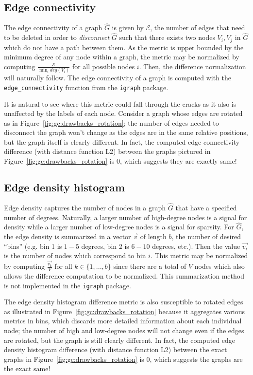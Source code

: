 \subsection{Edge connectivity}

The edge connectivity of a graph $\hat{G}$ is given by $\mathcal{E}$, the 
number of edges that need to be deleted in order to \textit{disconnect} 
$\hat{G}$ such that there exists two nodes $V_i,V_j$ in $\hat{G}$ which do not 
have a path between them.
As the metric is upper bounded by the minimum 
degree of any node within a graph, the metric may be normalized by computing 
$\frac{\mathcal{E}}{\min_i deg(V_i)}$ for all possible nodes $i$. Then, the 
difference normalization will naturally follow.
The edge connectivity of a graph is computed 
with the \texttt{edge\_connectivity} function from the \texttt{igraph} package. 

It is natural to see where this metric could fall through the cracks as it also 
is unaffected by the labels of each node. Consider 
a graph whose edges are rotated as in Figure~\ref{fig:gc:drawbacks_rotation}; 
the number of edges needed to disconnect the graph won't change as the edges 
are in the same relative positions, but the graph itself is clearly different. 
In fact, the computed edge connectivity difference (with distance function L2) 
between the graphs pictured in Figure~\ref{fig:gc:drawbacks_rotation} is 0, 
which suggests they are exactly same!

\subsection{Edge density histogram}

Edge density captures the number of nodes in a graph $\hat{G}$ that have a 
specified number of degrees. Naturally, a larger number of high-degree nodes is 
a signal for density while a larger number of low-degree nodes is a signal for 
sparsity. For $\hat{G}$, the edge density is summarized in a 
vector $\overrightarrow{v}$ of length $b$, the number of desired ``bins'' 
(e.g. bin 1 is $1-5$ degrees, bin 2 is $6-10$ degrees, etc.). Then the value 
$\overrightarrow{v_i}$ is the number of nodes which correspond to bin $i$. This 
metric may be normalized by computing $\frac{\overrightarrow{v_k}}{V}$ for 
all $k \in \{1,...,b\}$ since there are a total of $V$ nodes which also allows 
the difference computation to be normalized. 
This summarization method is not implemented in the \texttt{igraph} package. 

The edge density histogram difference metric is also susceptible to rotated 
edges as illustrated in Figure~\ref{fig:gc:drawbacks_rotation} because it 
aggregates various metrics in bins, which discards more detailed information 
about each individual node; the number of high and low-degree nodes 
will not change even if the edges are rotated, but the graph is still clearly 
different. In fact, the computed edge density histogram difference (with 
distance function L2) between the exact graphs in 
Figure~\ref{fig:gc:drawbacks_rotation} is 0, which suggests the graphs are the 
exact same!